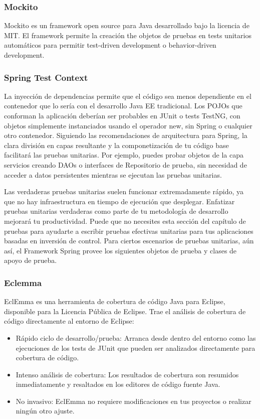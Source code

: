 \documentclass[12pt, a4paper, twoside]{book}
\begin{document}
	\subsubsection{Mockito}
	Mockito es un framework open source para Java desarrollado bajo la licencia de MIT. El framework permite la creación the objetos de pruebas en tests unitarios automáticos para permitir test-driven development o behavior-driven development.
	\subsubsection{Spring Test Context}
	La inyección de dependencias permite que el código sea menos dependiente en el contenedor que lo sería con el desarrollo Java EE tradicional. Los POJOs que conforman la aplicación deberían ser probables en JUnit o tests TestNG, con objetos simplemente instanciados usando el operador new, sin Spring o cualquier otro contenedor. Siguiendo las  recomendaciones de arquitectura para Spring, la clara división en capas resultante y la componetización de tu código base facilitará las pruebas unitarias. Por ejemplo, puedes probar objetos de la capa servicios creando DAOs o interfaces de Repositorio de prueba, sin necesidad de acceder a datos persistentes mientras se ejecutan las pruebas unitarias.
	
	Las verdaderas pruebas unitarias suelen funcionar extremadamente rápido, ya que no hay infraestructura en tiempo de ejecución que desplegar. Enfatizar pruebas unitarias verdaderas como parte de tu metodología de desarrollo mejorará tu productividad. Puede que no necesites esta sección del capítulo de pruebas para ayudarte a escribir pruebas efectivas unitarias para tus aplicaciones basadas en inversión de control.
	Para ciertos escenarios de pruebas unitarias, aún así, el Framework Spring provee los siguientes objetos de prueba y clases de apoyo de prueba.
	\subsubsection{Eclemma}	
	EclEmma es una herramienta de cobertura de código Java para Eclipse, disponible para la Licencia Pública de Eclipse. Trae el análisis de cobertura de código directamente al entorno de Eclipse:\cite{Eclemma}		
	\begin{itemize}
		\item Rápido ciclo de desarrollo/prueba: Arranca desde dentro del entorno como las ejecuciones de los tests de JUnit que pueden ser analizados directamente para cobertura de código.
		\item Intenso análisis de cobertura: Los resultados de cobertura son resumidos inmediatamente y resaltados en los editores de código fuente Java.
		\item No invasivo: EclEmma no requiere modificaciones en tus proyectos o realizar ningún otro ajuste.
	\end{itemize}	
\end{document}
